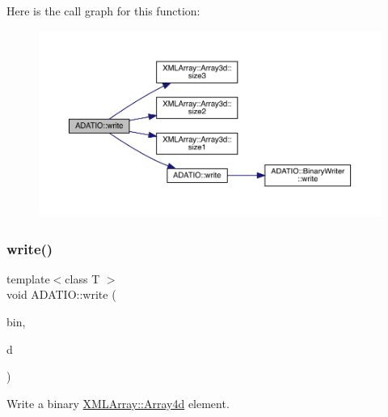 Here is the call graph for this function\+:
\nopagebreak
\begin{figure}[H]
\begin{center}
\leavevmode
\includegraphics[width=350pt]{d0/dba/namespaceADATIO_a7fbf1297a893fe12c3b03b9594408829_cgraph}
\end{center}
\end{figure}
\mbox{\label{namespaceADATIO_ad3c579901108d678f21ec1a97d0ab197}} 
\subsubsection{\texorpdfstring{write()}{write()}\hspace{0.1cm}{\footnotesize\ttfamily [19/25]}}
{\footnotesize\ttfamily template$<$class T $>$ \\
void A\+D\+A\+T\+I\+O\+::write (\begin{DoxyParamCaption}\item[{\mbox{\hyperlink{classADATIO_1_1BinaryWriter}{Binary\+Writer}} \&}]{bin,  }\item[{const \mbox{\hyperlink{classXMLArray_1_1Array4d}{X\+M\+L\+Array\+::\+Array4d}}$<$ T $>$ \&}]{d }\end{DoxyParamCaption})\hspace{0.3cm}{\ttfamily [inline]}}



Write a binary \mbox{\hyperlink{classXMLArray_1_1Array4d}{X\+M\+L\+Array\+::\+Array4d}} element. 

